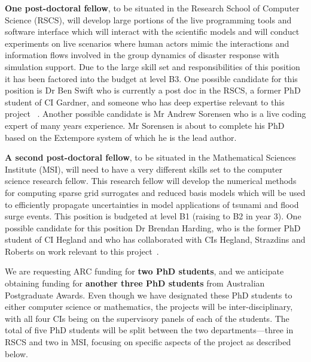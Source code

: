 \iffalse
Both  Dr Debusschere and Dr Jakeman
have offered to host visits from our group to the Livermore and
Albuquerque Sandia Laboratories. We plan to support reciprocal visits
to ANU.
\fi

{\bf One post-doctoral fellow}, to be situated in the Research School
of Computer Science (RSCS), will develop large portions of the live
programming tools and software interface which will interact with the
scientific models and will conduct experiments on live scenarios where
human actors mimic the interactions and information flows involved in
the group dynamics of disaster response with simulation support. Due
to the large skill set and responsibilities of this position it has
been factored into the budget at level B3.  One possible candidate for
this position is Dr Ben Swift who is currently a post doc in the RSCS, a
former PhD student of CI Gardner, and someone who has
deep expertise relevant to this project
~\parencite{martin2015tracking,martin2016intelligent,swiftLive2016,
  swift2013visual,swift2014coding}. Another possible candidate is Mr 
  Andrew Sorensen who is a live coding expert of many years experience. 
  Mr Sorensen is about to complete his PhD based
  on the Extempore system of which he is the lead author.

{\bf A second post-doctoral fellow}, to be situated in the
Mathematical Sciences Institute (MSI), will need to have a very
different skills set to the computer science research fellow. This
research fellow will develop the numerical methods for computing
sparse grid surrogates and reduced basis models which will be used to
efficiently propagate uncertainties in model applications of tsunami
and flood surge events. This position is budgeted at level B1 (raising
to B2 in year 3).  One possible candidate for this position Dr Brendan Harding, who 
is the former PhD student of CI Hegland and who has
collaborated with CIs Hegland, Strazdins and Roberts on work
relevant to this project~\parencite{Ali11022016, AliEtal2015,
  deBaarHarding2015, HardingHLS2015, sgctalg15}.


We are requesting ARC funding for {\bf two PhD students}, and we anticipate
obtaining funding for {\bf another three PhD students} from Australian Postgraduate
Awards. Even though we have designated these PhD students to either
computer science or mathematics, the projects will be
inter-disciplinary, with all four CIs being on the supervisory panels
of each of the students. The {total of five PhD students} will be split between
the two departments—three in RSCS and two in MSI, focusing on specific
aspects of the project as described below.


